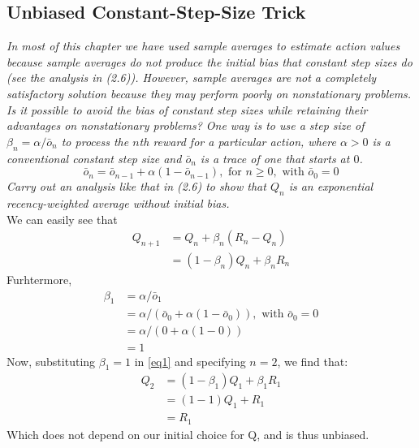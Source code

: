\documentclass{article}
\begin{document}
\subsection{Unbiased Constant-Step-Size Trick}
\textit{In most of this chapter we have used sample averages to estimate action values because sample averages do not produce the initial bias that constant step sizes do (see the analysis in (2.6)). However, sample averages are not a completely satisfactory solution because they may perform poorly on nonstationary problems. Is it possible to avoid the bias of constant step sizes while retaining their advantages on nonstationary problems? One way is to use a step size of $\beta_n = \alpha / \bar{o}_n$ to process the $n$th reward for a particular action, where $\alpha > 0$ is a conventional constant step size and $\bar{o}_n$ is a trace of one that starts at $0$. }
\begin{equation}
\bar{o}_n = \bar{o}_{n-1} + \alpha(1-\bar{o}_{n-1}), \text{ for } n \geq 0, \text{ with } \bar{o}_0 = 0
\end{equation}
\textit{Carry out an analysis like that in (2.6) to show that $Q_n$ is an exponential recency-weighted average without initial bias.}
\\

We can easily see that 
\begin{align}
Q_{n+1} &= Q_n + \beta_n (R_n - Q_n) \\
&= (1 - \beta_n) Q_n + \beta_n R_n \label{eq1}
\end{align}
Furhtermore,
\begin{align}
\beta_1 &= \alpha / \bar{o}_1 \\
&= \alpha / (\bar{o}_0 + \alpha(1 - \bar{o}_0)), \text{ with } \bar{o}_0 = 0 \\
&= \alpha/(0 + \alpha(1-0)) \\
&= 1
\end{align}
Now, substituting $\beta_1 = 1$ in \ref{eq1} and specifying $n = 2$, we find that:
\begin{align}
Q_{2} &= (1 - \beta_1) Q_1 + \beta_1 R_1 \\
&= (1-1) Q_1 + R_1 \\
&= R_1
\end{align}
Which does not depend on our initial choice for Q, and is thus unbiased.
\end{document}
